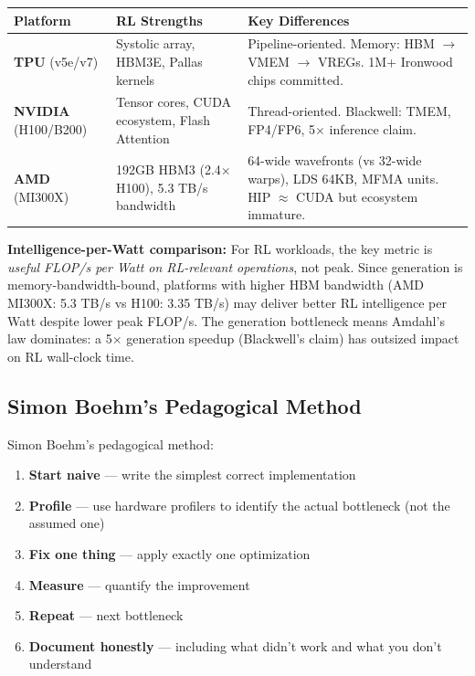 \begin{tabular}{@{}p{1.6cm}p{2.2cm}p{3.5cm}@{}}
\toprule
\textbf{Platform} & \textbf{RL Strengths} & \textbf{Key Differences} \\
\midrule
\textbf{TPU} (v5e/v7) & Systolic array, HBM3E, Pallas kernels & Pipeline-oriented. Memory: HBM $\to$ VMEM $\to$ VREGs. 1M+ Ironwood chips committed. \\
\textbf{NVIDIA} (H100/B200) & Tensor cores, CUDA ecosystem, Flash Attention & Thread-oriented. Blackwell: TMEM, FP4/FP6, 5$\times$ inference claim. \\
\textbf{AMD} (MI300X) & 192GB HBM3 (2.4$\times$ H100), 5.3 TB/s bandwidth & 64-wide wavefronts (vs 32-wide warps), LDS 64KB, MFMA units. HIP $\approx$ CUDA but ecosystem immature. \\
\bottomrule
\end{tabular}

\medskip

\textbf{Intelligence-per-Watt comparison:} For RL workloads, the key metric is \textit{useful FLOP/s per Watt on RL-relevant operations}, not peak. Since generation is memory-bandwidth-bound, platforms with higher HBM bandwidth (AMD MI300X: 5.3 TB/s vs H100: 3.35 TB/s) may deliver better RL intelligence per Watt despite lower peak FLOP/s. The generation bottleneck means Amdahl's law dominates: a 5$\times$ generation speedup (Blackwell's claim) has outsized impact on RL wall-clock time.

\subsection{Simon Boehm's Pedagogical Method}

Simon Boehm's pedagogical method:
\begin{enumerate}
  \item \textbf{Start naive} --- write the simplest correct implementation
  \item \textbf{Profile} --- use hardware profilers to identify the actual bottleneck (not the assumed one)
  \item \textbf{Fix one thing} --- apply exactly one optimization
  \item \textbf{Measure} --- quantify the improvement
  \item \textbf{Repeat} --- next bottleneck
  \item \textbf{Document honestly} --- including what didn't work and what you don't understand
\end{enumerate}

